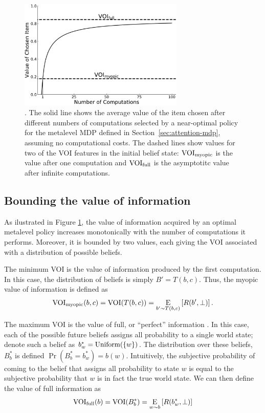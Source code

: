 \begin{figure}[b!]
  \centering
  \includegraphics[width=0.7\textwidth]{figs/attention/supp-voi-vpi.pdf}
  \caption{.
    The solid line shows the average value of the item chosen after different numbers of computations selected by a near-optimal policy for the metalevel MDP defined in Section~\ref{sec:attention-mdp}, assuming no computational costs. The dashed lines show values for two of the VOI features in the initial belief state: $\VOImy$ is the value after one computation and $\VPI$ is the asymptotitc value after infinite computations.
  }
  \label{fig:bmps-voi}
\end{figure}

\subsection{Bounding the value of information}

As ilustrated in Figure \ref{fig:bmps-voi}, the value of information acquired by an optimal metalevel policy increases monotonically with the number of computations it performs. Moreover, it is bounded by two values, each giving the VOI associated with a distribution of possible beliefs.

The minimum VOI is the value of information produced by the first computation. In this case, the distribution of beliefs is simply $B' = T(b, c)$. Thus, the myopic value of information is defined as
\begin{equation*}
  \VOImy(b,c) =  \VOI(T(b, c)) = \expectunder{R(b', \bot)}{b' \sim T(b, c)}.
\end{equation*}

The maximum VOI is the value of full, or ``perfect'' information \citep{howard1966information}. In this case, each of the possible future beliefs assigns all probability to a single world state; denote such a belief as $b^*_w = \Uniform(\{w\})$.
The distribution over these beliefs, $B^*_b$ is defined $\Pr(B^*_b = b^*_w ) = b(w)$. Intuitively, the subjective probability of coming to the belief that assigns all probability to state $w$ is equal to the subjective probability that $w$ is in fact the true world state. We can then define the value of full information as
\begin{equation}
  \VPI(b) = \VOI(B^*_b) = \expectunder{R(b^*_w, \bot)}{w \sim b}
\end{equation}


